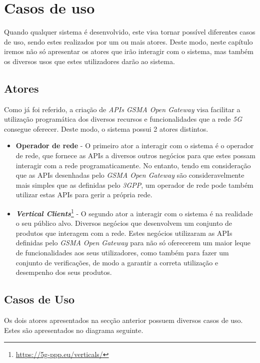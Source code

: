 \chapter{Casos de uso}

Quando qualquer sistema é desenvolvido, este visa tornar possível diferentes
casos de uso, sendo estes realizados por um ou mais atores. 
Deste modo, neste capítulo iremos não só apresentar os atores que irão
interagir com o sistema, mas também os diversos usos que estes utilizadores
darão ao sistema.

\section{Atores}

Como já foi referido, a criação de \emph{APIs GSMA Open Gateway} visa facilitar
a utilização programática dos diversos recursos e funcionalidades que a rede
\emph{5G} consegue oferecer. Deste modo, o sistema possui 2 atores distintos.
\begin{itemize}
	\item \textbf{Operador de rede} - O primeiro ator a interagir
	      com o sistema é o operador de rede, que fornece as APIs a diversos outros
	      negócios para que estes possam interagir com a rede programaticamente. No
	      entanto, tendo em consideração que as APIs desenhadas pelo \emph{GSMA Open
		      Gateway} são consideravelmente mais simples que as definidas pelo
	      \emph{3GPP}, um operador de rede pode também utilizar estas APIs para gerir a
	      própria rede.

	\item \textbf{\emph{Vertical
			      Clients}}\footnote{\url{https://5g-ppp.eu/verticals/}} - O segundo ator a
	      interagir com o sistema é na realidade o seu público alvo. Diversos
	      negócios que desenvolvem um conjunto de produtos que interagem com a rede.
	      Estes negócios utilizaram as APIs definidas pelo \emph{GSMA Open Gateway}
	      para não só oferecerem um maior leque de funcionalidades aos seus
	      utilizadores, como também para fazer um conjunto de verificações, de modo a
	      garantir a correta utilização e desempenho dos seus produtos. \end{itemize}

\section{Casos de Uso}

Os dois atores apresentados na secção anterior possuem diversos casos de uso.
Estes são apresentados no diagrama seguinte.

